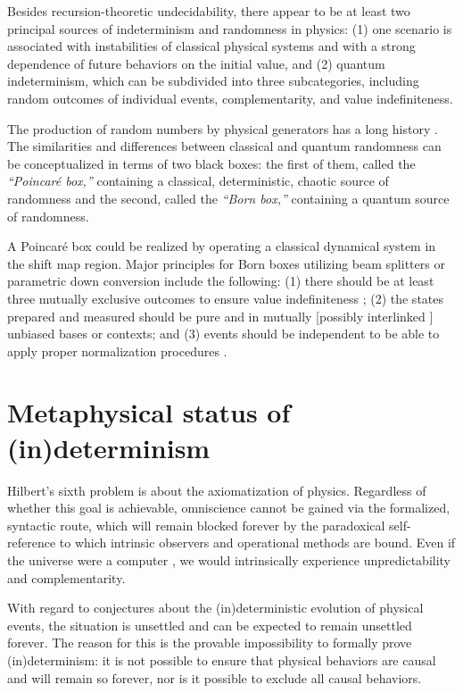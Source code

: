 \documentclass[%
 reprint,
 showpacs,
 showkeys,
 preprintnumbers,
 amsmath,amssymb,
 aps,
 prl,
  longbibliography,
 ]{revtex4-1}
\begin{document}
Besides recursion-theoretic undecidability,
there appear to be at least two principal sources of indeterminism and randomness in physics:
(1) one scenario is associated with instabilities of classical physical systems
and with a strong dependence of future behaviors on the initial value, and
(2) quantum indeterminism, which can be subdivided into three subcategories, including  random outcomes of individual events,
 complementarity, and
value indefiniteness.

The production of random numbers by  physical generators has a long history \citep{rand-55}.
The similarities and differences between classical and quantum randomness can be conceptualized
in terms of two  black boxes: the first  of them,  called the {\em ``Poincar{\'e} box,''}
containing a classical, deterministic, chaotic source of randomness and
the second,  called the {\em ``Born box,''}
containing a quantum source of randomness.

A Poincar{\'e} box could be realized by operating a classical dynamical system in the shift map region.
Major principles for  Born boxes utilizing beam
splitters or parametric down conversion
include the following:
(1) there should be at least three mutually exclusive outcomes to ensure value indefiniteness
\citep{PhysRevLett.85.3313,2008-cal-svo,svozil-2009-howto,1367-2630-12-1-013019,10.1038/nature09008};
(2) the states prepared and measured should be pure and in mutually  [possibly interlinked \citep{svozil:040102}]
unbiased bases or contexts; and
(3) events should be independent  to be able to apply proper normalization procedures \citep{von-neumann1,Samuelson-1968}.


\section{Metaphysical status of (in)determinism}

Hilbert's \citeyearpar{hilbert-1900e} sixth problem is about the axiomatization of physics.
Regardless of whether this goal is achievable,
omniscience cannot be gained
via the formalized, syntactic route,
which will remain blocked forever by the paradoxical self-reference
to which intrinsic observers and operational methods are bound.
Even if the universe were a computer \citep{zuse-70,fredkin,wolfram-2002,svozil-2005-cu},
we would intrinsically experience unpredictability and complementarity.


With regard to conjectures about the (in)deterministic evolution of physical events,
the situation is unsettled and can be expected to remain unsettled forever.
The reason for this is the provable impossibility to formally prove (in)determinism:
it is not possible to ensure that physical behaviors are causal and will remain so forever,
nor is it possible to exclude all causal behaviors.
\end{document}
